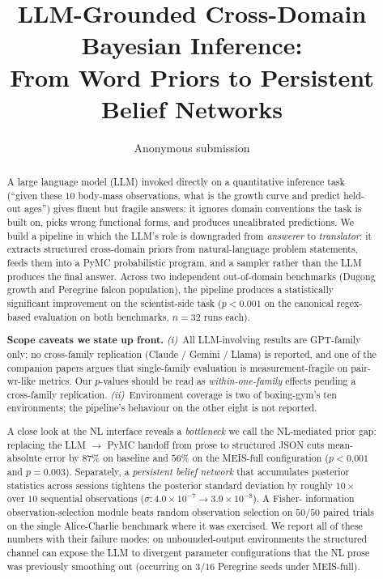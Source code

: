 \documentclass{article}
\title{\textbf{LLM-Grounded Cross-Domain Bayesian Inference:}\\
From Word Priors to Persistent Belief Networks}
\author{%
  Anonymous submission\\
}
\date{}
\begin{document}
\maketitle

\begin{abstract}
\noindent
A large language model (LLM) invoked directly on a quantitative
inference task (``given these $10$ body-mass observations, what is the
growth curve and predict held-out ages'') gives fluent but
fragile answers: it ignores domain conventions the task is built on,
picks wrong functional forms, and produces uncalibrated predictions.
We build a pipeline in which the LLM's role is downgraded from
\emph{answerer} to \emph{translator}: it extracts structured
cross-domain priors from natural-language problem statements, feeds
them into a PyMC probabilistic program, and a sampler rather than the
LLM produces the final answer. Across two independent out-of-domain
benchmarks (Dugong growth and Peregrine falcon population), the
pipeline produces a statistically significant improvement on the
scientist-side task ($p < 0.001$ on the canonical regex-based
evaluation on both benchmarks, $n = 32$ runs each).

\textbf{Scope caveats we state up front.}
\emph{(i)}~All LLM-involving results are GPT-family only; no
cross-family replication (Claude / Gemini / Llama) is reported, and
one of the companion papers argues that single-family evaluation
is measurement-fragile on pair-wr-like metrics. Our $p$-values
should be read as \emph{within-one-family} effects pending a
cross-family replication.
\emph{(ii)}~Environment coverage is two of boxing-gym's ten
environments; the pipeline's behaviour on the other eight is not
reported.

A close look at the NL interface reveals a \emph{bottleneck} we call
the NL-mediated prior gap: replacing the LLM $\to$ PyMC handoff from
prose to structured JSON cuts mean-absolute error by $87\%$ on
baseline and $56\%$ on the MEIS-full configuration ($p < 0.001$ and
$p = 0.003$). Separately, a \emph{persistent belief network} that
accumulates posterior statistics across sessions tightens the
posterior standard deviation by roughly $10\times$ over $10$
sequential observations
($\sigma: 4.0 \times 10^{-7} \to 3.9 \times 10^{-8}$). A Fisher-
information observation-selection module beats random observation
selection on $50/50$ paired trials on the single Alice-Charlie
benchmark where it was exercised. We report all of these numbers
with their failure modes: on unbounded-output environments the
structured channel can expose the LLM to divergent parameter
configurations that the NL prose was previously smoothing out
(occurring on $3/16$ Peregrine seeds under MEIS-full).
\end{abstract}
\end{document}
